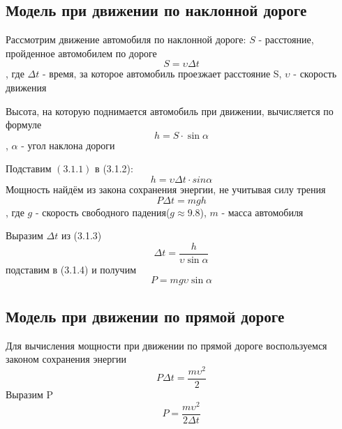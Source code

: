 \documentclass[a4paper, 14pt]{extarticle}
\begin{document}
		\subsection{Модель при движении по наклонной дороге}
			Рассмотрим движение автомобиля по наклонной дороге:
			\( S \) - расстояние, пройденное автомобилем по дороге
			\[ S = \upsilon \Delta t \tag{3.1.1} \label{eq:special} \]
			, где \( \Delta t \) - время, за которое автомобиль проезжает расстояние S,
			\( \upsilon \) - скорость движения
	
			Высота, на которую поднимается автомобиль при движении, вычисляется по формуле
			\[ h = S \cdot \sin{\alpha} \tag{3.1.2} \label{eq:special}\], $\alpha$ - угол наклона дороги
			
			Подставим \( (3.1.1) \) в (3.1.2):
			\[ h = \upsilon \Delta t \cdot sin{\alpha}  \tag{3.1.3} \label{eq:special} \]
			Мощность найдём из закона сохранения энергии, не учитывая силу трения
			\[ P \Delta t = mgh  \tag{3.1.4} \label{eq:special}\]
			, где \( g \) - скорость свободного падения(\( g \approx 9.8 \)), $m$ - масса автомобиля
			
			Выразим \( \Delta t\) из (3.1.3)
			\[ \Delta t = \dfrac{h}{\upsilon \sin{\alpha}} \]
			подставим в (3.1.4) и получим
			\[ P = mg \upsilon \sin{\alpha} \]
		\subsection{Модель при движении по прямой дороге}
			Для вычисления мощности при движении по прямой дороге воспользуемся
			законом сохранения энергии
			\[ P \Delta t = \dfrac{m\upsilon^2}{2} \]
			Выразим P
			\[ P = \dfrac{m\upsilon^2}{2\Delta t} \]
	
\end{document}

